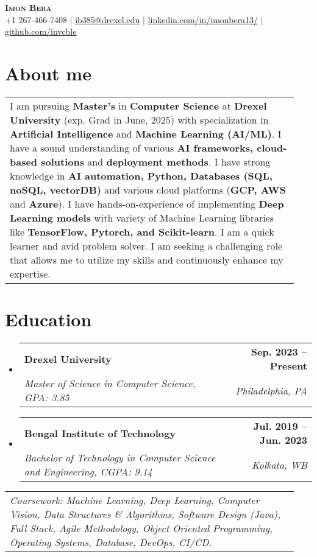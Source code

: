 \documentclass[letterpaper,10pt]{article}
\makeatletter
\newcommand{\resumeSubheading}[4]{
  \vspace{0pt}\item
    \begin{tabular*}{0.97\textwidth}[t]{l@{\extracolsep{\fill}}r}
      \textbf{#1} & \textbf{#2} \\
      \textit{\small#3} & \textit{\small #4} \\
    \end{tabular*}\vspace{-7pt}
}
\newcommand{\resumeSubHeadingListStart}{\begin{itemize}[leftmargin=0.15in, label={}]}
\newcommand{\resumeSubHeadingListEnd}{\end{itemize}}
\makeatother
\begin{document}
\begin{center}
    \textbf{\Huge \scshape Imon Bera} \\ \vspace{1pt}
    \small +1 267-466-7408 $|$ 
    \href{mailto:ib385@drexel.edu}{ib385@drexel.edu} $|$ 
    \href{https://www.linkedin.com/in/imonbera13/}{\underline{linkedin.com/in/imonbera13/}} $|$
    \href{https://github.com/invcble}{\underline{github.com/invcble}}
\end{center}

\section{About me}
  \vspace{0.2em}
    \hspace{0.15in}\begin{tabular}{p{0.94\linewidth}}
    I am pursuing \textbf{Master’s} in \textbf{Computer Science} at \textbf{Drexel University} (exp. Grad in June, 2025) with specialization in \textbf{Artificial Intelligence} and \textbf{Machine Learning (AI/ML)}. I have a sound understanding of various \textbf{AI frameworks, cloud-based solutions} and \textbf{deployment methods}. I have strong knowledge in \textbf{AI automation, Python, Databases (SQL, noSQL, vectorDB)} and various cloud platforms (\textbf{GCP, AWS} and \textbf{Azure}). I have hands-on-experience of implementing \textbf{Deep Learning models} with variety of Machine Learning libraries like \textbf{TensorFlow, Pytorch, and Scikit-learn}. I am a quick learner and avid problem solver. I am seeking a challenging role that allows me to utilize my skills and continuously enhance my expertise.
\end{tabular}

\section{Education}
\resumeSubHeadingListStart
  \resumeSubheading
    {Drexel University}{Sep. 2023 -- Present}
    {Master of Science in Computer Science, GPA: 3.85}{Philadelphia, PA}
  \resumeSubheading
    {Bengal Institute of Technology}{Jul. 2019 -- Jun. 2023}
    {Bachelor of Technology in Computer Science and Engineering, CGPA: 9.14}{Kolkata, WB}
\resumeSubHeadingListEnd

  \vspace{0.2em}
    \hspace{0.15in}\begin{tabular}{p{0.94\linewidth}}
    \textit{{Coursework}: Machine Learning, Deep Learning, Computer Vision, Data Structures \& Algorithms, Software Design (Java), Full Stack, Agile Methodology, Object Oriented Programming, Operating Systems, Database, DevOps, CI/CD.}
\end{tabular}
\end{document}
